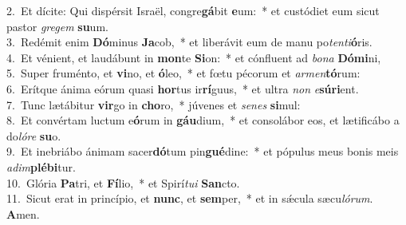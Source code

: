 {2.~}Et dícite: Qui dispérsit Israël, congre\textbf{gá}bit \textbf{e}um:~* et custódiet eum sicut pastor \textit{gre}\textit{gem} \textbf{su}um.\\
{3.~}Redémit enim \textbf{Dó}minus \textbf{Ja}cob,~* et liberávit eum de manu po\textit{ten}\textit{ti}\textbf{ó}ris.\\
{4.~}Et vénient, et laudábunt in \textbf{mon}te \textbf{Si}on:~* et cónfluent ad \textit{bo}\textit{na} \textbf{Dó}\textbf{mi}ni,\\
{5.~}Super fruménto, et \textbf{vi}no, et \textbf{ó}leo,~* et fœtu pécorum et \textit{ar}\textit{men}\textbf{tó}rum:\\
{6.~}Erítque ánima eórum quasi \textbf{hor}tus ir\textbf{rí}guus,~* et ultra \textit{non} \textit{e}\textbf{sú}\textbf{ri}ent.\\
{7.~}Tunc lætábitur \textbf{vir}go in \textbf{cho}ro,~* júvenes et \textit{se}\textit{nes} \textbf{si}mul:\\
{8.~}Et convértam luctum e\textbf{ó}rum in \textbf{gáu}dium,~* et consolábor eos, et lætificábo a do\textit{ló}\textit{re} \textbf{su}o.\\
{9.~}Et inebriábo ánimam sacer\textbf{dó}tum pin\textbf{gué}dine:~* et pópulus meus bonis meis \textit{a}\textit{dim}\textbf{plé}\textbf{bi}tur.\\
{10.~}Glória \textbf{Pa}tri, et \textbf{Fí}lio,~* et Spirí\textit{tu}\textit{i} \textbf{San}cto.\\
{11.~}Sicut erat in princípio, et \textbf{nunc}, et \textbf{sem}per,~* et in sǽcula sæcu\textit{ló}\textit{rum}. \textbf{A}men.\\
